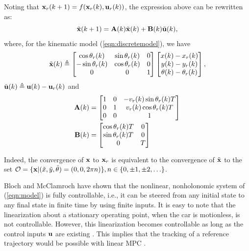 \documentclass[twocolumn]{IEEEtran} %
\begin{document}
Noting that ${\bf x}_r(k+1)=f({\bf x}_r(k),{\bf u}_r(k))$, the expression above can be rewritten as:
\begin{equation}\label{eqn:error}
	\tilde{\bf x}(k+1) = {\bf A}(k)\tilde{\bf x}(k)+{\bf B}(k)\tilde{\bf u}(k),
\end{equation}
where, for the kinematic model (\ref{eqn:discretemodel}), we have
\begin{equation*}
	\tilde{\bf x}(k) \triangleq \begin{bmatrix}
		\cos\theta_r(k)  & \sin\theta_r(k) & 0 \\
		-\sin\theta_r(k) & \cos\theta_r(k) & 0 \\
		0		       & 0		     & 1
	\end{bmatrix} 
	\begin{bmatrix}
		x(k)-x_r(k) \\ y(k)-y_r(k) \\ \theta(k)-\theta_r(k)
	\end{bmatrix},
\end{equation*}
$\tilde{\bf u}(k)\triangleq{\bf u}(k)-{\bf u}_r(k)$ and
\begin{align*}
	{\bf A}(k) &= \begin{bmatrix}
		1 & 0 & -v_r(k)\sin\theta_r(k)T \\
		0 & 1 &  v_r(k)\cos\theta_r(k)T \\
		0 & 0 & 1
	\end{bmatrix} \\
	{\bf B}(k) &= \begin{bmatrix}
		\cos\theta_r(k)T & 0 \\
		\sin\theta_r(k)T & 0 \\
		0 			  & T
	\end{bmatrix}
\end{align*}

Indeed, the convergence of ${\bf x}$ to ${\bf x}_r$ is equivalent to the convergence of $\tilde{\bf x}$ to the set ${\cal O}=\{{\bf x}|(\tilde x,\tilde y,\tilde\theta)=(0,0,2\pi n)\},n\in \{0,\pm1,\pm2,\ldots\}$.

Bloch and McClamroch \cite{bloch89} have shown that the nonlinear, nonholonomic system of (\ref{eqn:model}) is fully controllable, i.e., it can be steered from any initial state to any final state in finite time by using finite inputs. It is easy to note that the linearization about a stationary operating point, when the car is motionless, is not controllable. However, this linearization becomes controllable as long as the control inputs ${\bf u}$ are existing \cite{samson91}. This implies that the tracking of a reference trajectory would be possible with linear MPC \cite{essen01}.
\end{document}
